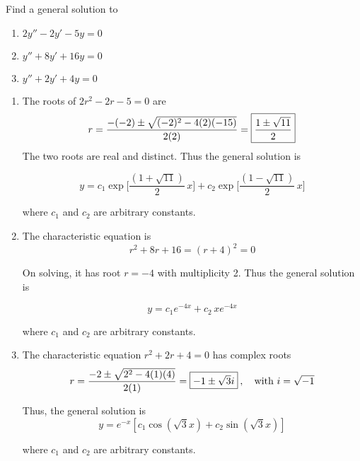 \begin{example}
    Find a general solution to
    \begin{enumerate}
        \item $2y'' - 2y' - 5y = 0$
        \item $y'' + 8y' + 16y = 0$
        \item $y'' + 2y' + 4y = 0$
    \end{enumerate}
\end{example}
\begin{solution}
    \begin{enumerate}
        The DEs above can be solve using the method of characteristic equation. 

        \item The roots of $2r^2 - 2r - 5 = 0$ are 
            \[
                r = \frac{-(-2) \pm \sqrt{(-2)^2 - 4(2)(-15)}}{2(2)} = \fbox{$\displaystyle \frac{1 \pm \sqrt{11}}{2}$}
            \]
            The two roots are real and distinct. Thus the general solution is 

            \[
                y = c_1 \exp \biggl[ \frac{(1 + \sqrt{11})}{2} \,x \biggr] + c_2 \exp \biggl[ \frac{(1 - \sqrt{11})}{2} \,x\biggr]
            \]

            where $c_1$ and $c_2$ are arbitrary constants.

        \item The characteristic equation is 
            \[
                r^2 + 8r + 16 = (r + 4)^2 = 0
            \]

            On solving, it has root $r = -4$ with multiplicity 2.
            Thus the general solution is 

            \[
                y = c_1e^{-4x} + c_2 \,xe^{-4x}
            \]

            where $c_1$ and $c_2$ are arbitrary constants.

        \item The characteristic equation $r^2 + 2r + 4 = 0$ has complex roots 
            \[
                r = \frac{-2 \pm \sqrt{2^2 - 4(1)(4)}}{2(1)} = \fbox{$-1 \pm \sqrt{3} i$}\>, \quad \text{with } i = \sqrt{-1}
            \]

            Thus, the general solution is 
            \[
                y = e^{-x}[c_1 \cos(\sqrt{3}x) + c_2 \sin(\sqrt{3}x)]
            \]

            where $c_1$ and $c_2$ are arbitrary constants.
    \end{enumerate}
\end{solution}


